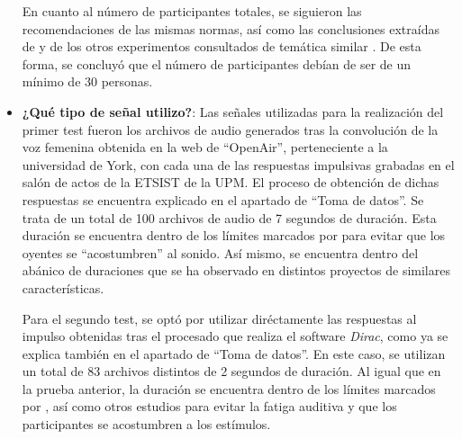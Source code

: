 \documentclass[11pt,a4paper,twoside]{book}
\begin{document}
\begin{itemize}
                    En cuanto al número de participantes totales, se siguieron las recomendaciones de las mismas normas, así como las conclusiones extraídas de \cite{Tejada2020} y de los otros experimentos consultados de temática similar \cite{2005IWitew, 2019DJSchlit, 2016SKlockgether, 2019LKritly, 2019GPulvirenti, 2019MNowak, 2011VEmiya}. De esta forma, se concluyó que el número de participantes debían de ser de un mínimo de 30 personas.
                    \item \textbf{¿Qué tipo de señal utilizo?}: Las señales utilizadas para la realización del primer test fueron los archivos de audio generados tras la convolución de la voz femenina obtenida en la web de ``OpenAir'', perteneciente a la universidad de York, con cada una de las respuestas impulsivas grabadas en el salón de actos de la ETSIST de la UPM. El proceso de obtención de dichas respuestas se encuentra explicado en el apartado de ``Toma de datos''. Se trata de un total de 100 archivos de audio de 7 segundos de duración. Esta duración se encuentra dentro de los límites marcados por \cite{UIT1116, UIT1534, UIT1284, EBU3286, UIT1285, UIT1286} para evitar que los oyentes se ``acostumbren'' al  sonido. Así mismo, se encuentra dentro del abánico de duraciones que se ha observado en distintos proyectos de similares características. \newline
                
                    Para el segundo test, se optó por utilizar diréctamente las respuestas al impulso obtenidas tras el procesado que realiza el software \textit{Dirac}, como ya se explica también en el apartado de ``Toma de datos''. En este caso, se utilizan un total de 83 archivos distintos de 2 segundos de duración. Al igual que en la prueba anterior, la duración se encuentra dentro de los límites marcados por \cite{UIT1116, UIT1534, UIT1284, EBU3286, UIT1285, UIT1286}, así como otros estudios para evitar la fatiga auditiva y que los participantes se acostumbren a los estímulos.
                

\end{itemize}
\end{document}
